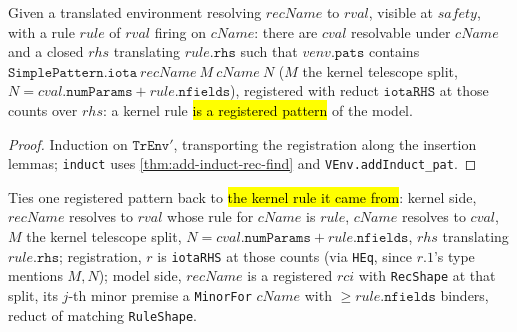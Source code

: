 \begin{theorem}
\label{thm:tr-env-pats-iota}
\leanok
{}

 Given a translated environment resolving $recName$ to $rval$, visible at
$safety$, with a rule $rule$ of $rval$ firing on $cName$: there are $cval$ resolvable
under $cName$ and a closed $rhs$ translating $rule.\mathtt{rhs}$ such that
$venv.\mathtt{pats}$ contains $\mathtt{SimplePattern.iota}\ recName\ M\ cName\ N$ ($M$ the
kernel telescope split, $N = cval.\mathtt{numParams} + rule.\mathtt{nfields}$), registered
with reduct $\mathtt{iotaRHS}$ at those counts over $rhs$: a kernel rule \hl{is a
registered pattern} of the model.
\end{theorem}
\begin{proof}
\leanok
{} Induction on $\mathtt{TrEnv}'$, transporting the registration along the
insertion lemmas; \texttt{induct} uses \ref{thm:add-induct-rec-find} and
\texttt{VEnv.addInduct\_pat}.
\end{proof}

\begin{definition}
\label{struct:iota-rule}
\leanok
{}

 Ties one registered pattern back to \hl{the kernel rule it came from}:
kernel side, $recName$ resolves to $rval$ whose rule for $cName$ is $rule$, $cName$
resolves to
$cval$, $M$ the kernel telescope split, $N = cval.\mathtt{numParams} +
rule.\mathtt{nfields}$, $rhs$ translating $rule.\mathtt{rhs}$; registration, $r$ is
\texttt{iotaRHS} at those counts (via \texttt{HEq}, since $r.1$'s type mentions $M,N$);
model side, $recName$ is a registered $rci$ with \texttt{RecShape} at that split, its
$j$-th minor premise a \texttt{MinorFor} $cName$ with $\ge rule.\mathtt{nfields}$ binders,
reduct of matching \texttt{RuleShape}.
\end{definition}


